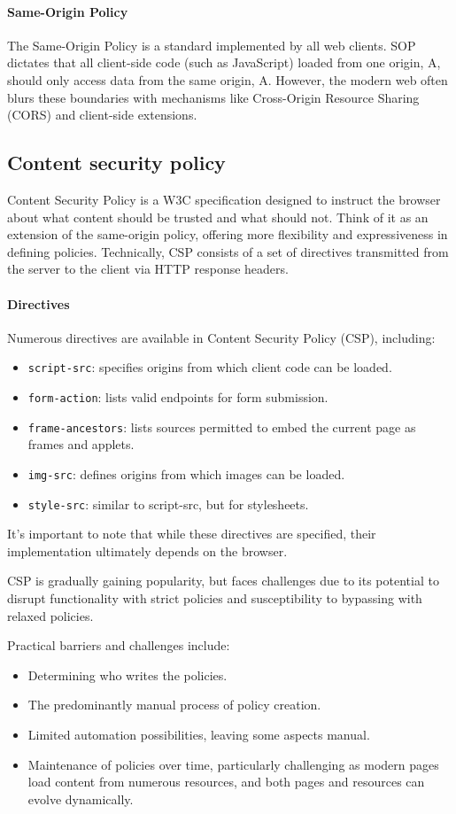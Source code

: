 \paragraph*{Same-Origin Policy}
The Same-Origin Policy is a standard implemented by all web clients. 
SOP dictates that all client-side code (such as JavaScript) loaded from one origin, A, should only access data from the same origin, A. 
However, the modern web often blurs these boundaries with mechanisms like Cross-Origin Resource Sharing (CORS) and client-side extensions.

\subsection{Content security policy}
Content Security Policy is a W3C specification designed to instruct the browser about what content should be trusted and what should not. 
Think of it as an extension of the same-origin policy, offering more flexibility and expressiveness in defining policies. 
Technically, CSP consists of a set of directives transmitted from the server to the client via HTTP response headers.

\paragraph*{Directives}
Numerous directives are available in Content Security Policy (CSP), including:
\begin{itemize}
    \item \texttt{script-src}: specifies origins from which client code can be loaded.
    \item \texttt{form-action}: lists valid endpoints for form submission.
    \item \texttt{frame-ancestors}: lists sources permitted to embed the current page as frames and applets.
    \item \texttt{img-src}: defines origins from which images can be loaded.
    \item \texttt{style-src}: similar to script-src, but for stylesheets.
\end{itemize}
It's important to note that while these directives are specified, their implementation ultimately depends on the browser.

CSP is gradually gaining popularity, but faces challenges due to its potential to disrupt functionality with strict policies and susceptibility to bypassing with relaxed policies.

Practical barriers and challenges include:
\begin{itemize}
    \item Determining who writes the policies.
    \item The predominantly manual process of policy creation.
    \item Limited automation possibilities, leaving some aspects manual.
    \item Maintenance of policies over time, particularly challenging as modern pages load content from numerous resources, and both pages and resources can evolve dynamically.
\end{itemize}